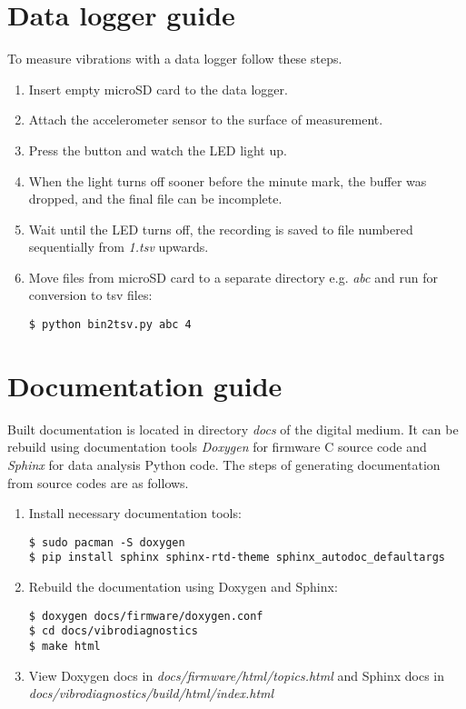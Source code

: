\section{Data logger guide}
To measure vibrations with a data logger follow these steps.

\begin{enumerate}[noitemsep]
\item Insert empty microSD card to the data logger.
\item Attach the accelerometer sensor to the surface of measurement.
\item Press the button and watch the LED light up.
\item When the light turns off sooner before the minute mark, the buffer was dropped, and the final file can be incomplete.
\item Wait until the LED turns off, the recording is saved to file numbered sequentially from \emph{1.tsv} upwards.
\item {Move files from microSD card to a separate directory e.g. \emph{abc} and run for conversion to tsv files:
\begin{lstlisting}[style=messages]
$ python bin2tsv.py abc 4
\end{lstlisting}}
\end{enumerate}


\section{Documentation guide}
Built documentation is located in directory \emph{docs} of the digital medium. It can be rebuild using documentation tools \emph{Doxygen} for firmware C source code and \emph{Sphinx} for data analysis Python code. The steps of generating documentation from source codes are as follows.

\begin{enumerate}[noitemsep]
\item {Install necessary documentation tools:
\begin{lstlisting}[style=messages]
$ sudo pacman -S doxygen
$ pip install sphinx sphinx-rtd-theme sphinx_autodoc_defaultargs
\end{lstlisting}}
\item {Rebuild the documentation using Doxygen and Sphinx:
\begin{lstlisting}[style=messages]
$ doxygen docs/firmware/doxygen.conf
$ cd docs/vibrodiagnostics
$ make html
\end{lstlisting}}
\item {View Doxygen docs in \emph{docs/firmware/html/topics.html} and Sphinx docs in \emph{docs/vibrodiagnostics/build/html/index.html}}
\end{enumerate}